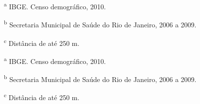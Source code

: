 \documentclass{article}
\begin{document}
\textsuperscript{a}
IBGE. Censo demográfico, 2010.

\textsuperscript{b}
Secretaria Municipal de Saúde do Rio de Janeiro, 2006 a 2009.

\textsuperscript{c}
Distância de até 250 m.

\textsuperscript{a}
IBGE. Censo demográfico, 2010.

\textsuperscript{b}
Secretaria Municipal de Saúde do Rio de Janeiro, 2006 a 2009.

\textsuperscript{c}
Distância de até 250 m.
\end{document}
